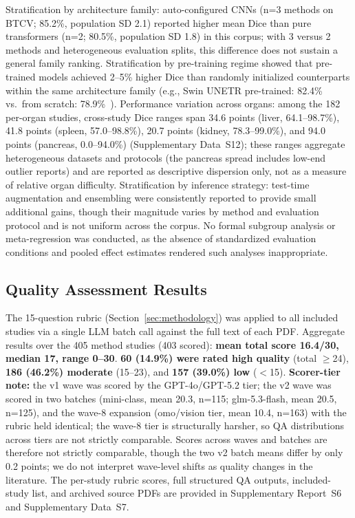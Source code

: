 Stratification by architecture family: auto-configured CNNs (n=3 methods on BTCV; 85.2\%, population SD 2.1) reported higher mean Dice than pure transformers (n=2; 80.5\%, population SD 1.8) in this corpus; with 3 versus 2 methods and heterogeneous evaluation splits, this difference does not sustain a general family ranking. Stratification by pre-training regime showed that pre-trained models achieved 2--5\% higher Dice than randomly initialized counterparts within the same architecture family (e.g., Swin UNETR pre-trained: 82.4\% vs.\ from scratch: 78.9\%~\cite{tang2022selfsupervised}). Performance variation across organs: among the 182 per-organ studies, cross-study Dice ranges span 34.6 points (liver, 64.1--98.7\%), 41.8 points (spleen, 57.0--98.8\%), 20.7 points (kidney, 78.3--99.0\%), and 94.0 points (pancreas, 0.0--94.0\%) (Supplementary Data~S12); these ranges aggregate heterogeneous datasets and protocols (the pancreas spread includes low-end outlier reports) and are reported as descriptive dispersion only, not as a measure of relative organ difficulty. Stratification by inference strategy: test-time augmentation and ensembling were consistently reported to provide small additional gains, though their magnitude varies by method and evaluation protocol and is not uniform across the corpus. No formal subgroup analysis or meta-regression was conducted, as the absence of standardized evaluation conditions and pooled effect estimates rendered such analyses inappropriate.

\subsection{Quality Assessment Results}
\label{sec:qa-results}

The 15-question rubric (Section~\ref{sec:methodology}) was applied to all included studies via a single LLM batch call against the full text of each PDF. Aggregate results over the 405 method studies (403 scored): \textbf{mean total score 16.4/30, median 17, range 0--30}. \textbf{60 (14.9\%) were rated high quality} (total $\geq$24), \textbf{186 (46.2\%) moderate} (15--23), and \textbf{157 (39.0\%) low} ($<$15). \textbf{Scorer-tier note:} the v1 wave was scored by the GPT-4o/GPT-5.2 tier; the v2 wave was scored in two batches (mini-class, mean 20.3, n=115; glm-5.3-flash, mean 20.5, n=125), and the wave-8 expansion (omo/vision tier, mean 10.4, n=163) with the rubric held identical; the wave-8 tier is structurally harsher, so QA distributions across tiers are not strictly comparable. Scores across waves and batches are therefore not strictly comparable, though the two v2 batch means differ by only 0.2 points; we do not interpret wave-level shifts as quality changes in the literature. The per-study rubric scores, full structured QA outputs, included-study list, and archived source PDFs are provided in Supplementary Report~S6 and Supplementary Data~S7.

